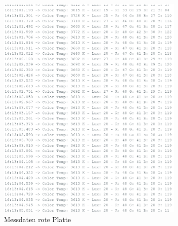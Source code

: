 \documentclass[../main.tex]{subfiles}
\begin{document}
\begin{figure}[H]
    \begin{subfigure}{0.35\textwidth}
        \centering
        \includegraphics[width=\linewidth]{img/sensortest/MD_RotePlatte_101ms.png}
        \caption{Messdaten rote Platte}
        \label{fig:MDFarbsensorPlatte}
    \end{subfigure}
    \begin{subfigure}{0.35\textwidth}
        \centering

\end{subfigure}
\end{figure}
\end{document}
